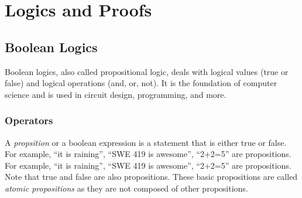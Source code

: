 \documentclass[oneside,11pt,dvipsnames]{book}
\begin{document}
\begin{itemize}


\end{itemize}

\chapter{Logics and Proofs}\label{chap:logics}

\section{Boolean Logics}

Boolean logics, also called propositional logic, deals with logical values (true or false) and logical operations (and, or, not). It is the foundation of computer science and is used in circuit design, programming, and more. 

\subsection{Operators}

A \emph{propsition} or a boolean expression is a statement that is either true or false. For example, ``it is raining'', ``SWE 419 is awesome'', ``2+2=5'' are propositions. For example, ``it is raining'', ``SWE 419 is awesome'', ``2+2=5'' are propositions. Note that true and false are also propositions.  These basic propositions are called \emph{atomic propositions} as they are not composed of other propositions.
\end{document}
